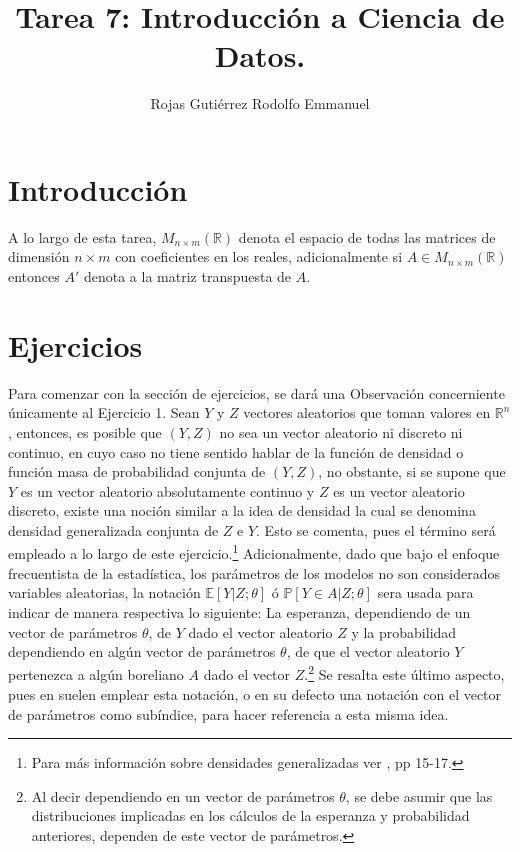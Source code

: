 \documentclass[10.5pt,notitlepage]{article}
\title{Tarea 7: Introducción a Ciencia de Datos.}
\author{Rojas Gutiérrez Rodolfo Emmanuel}
\renewcommand{\qedsymbol}{$\blacksquare$}
\newcommand{\PP}{\mathbb{P}}
\newcommand{\RR}{\mathbb{R}}
\newcommand{\EE}{\mathbb{E}}
\theoremstyle{plain}
\newenvironment{rem}
  {\pushQED{\qed}\renewcommand{\qedsymbol}{$\triangle$}\remarkex}
  {\popQED\endremarkex}
\begin{document}
\maketitle
\section{Introducción}
A lo largo de esta tarea, \(M_{n\times m}(\RR)\) denota el espacio de todas las matrices de dimensión \(n\times m\) con coeficientes en los reales, adicionalmente si \(A \in M_{n\times m}(\RR)\) entonces \(A'\) denota a la matriz transpuesta de \(A\).

\section{Ejercicios}
Para comenzar con la sección de ejercicios, se dará una Observación concerniente únicamente al Ejercicio 1.
\begin{rem}
Sean \(Y\) y \(Z\) vectores aleatorios que toman valores en \(\RR^n\), entonces, es posible que \((Y,Z)\) no sea un vector aleatorio ni discreto ni continuo, en cuyo caso no tiene sentido hablar de la función de densidad o función masa de probabilidad conjunta de \((Y,Z)\), no obstante, si se supone que \(Y\) es un vector aleatorio absolutamente continuo y \(Z\) es un vector aleatorio discreto, existe una noción similar a la idea de densidad la cual se denomina densidad generalizada conjunta de \(Z\) e \(Y\). Esto se comenta, pues el término será empleado a lo largo de este ejercicio.\footnote{Para más información sobre densidades generalizadas ver \textcite{martingonzalezProbabilidadAvanzada2021}, pp 15-17.} Adicionalmente, dado que bajo el enfoque frecuentista de la estadística, los parámetros de los modelos no son considerados variables aleatorias, la notación \(\EE[Y| Z ; \theta ]\) ó \(\PP[Y \in A| Z ; \theta ]\) sera usada para indicar de manera respectiva lo siguiente: La esperanza, dependiendo de un vector de parámetros \(\theta\), de \(Y\) dado el vector aleatorio \(Z\) y la probabilidad dependiendo en algún vector de parámetros \(\theta\), de que el vector aleatorio \(Y\) pertenezca a algún boreliano \(A\) dado el vector \(Z\).\footnote{Al decir dependiendo en un vector de parámetros \(\theta\), se debe asumir que las distribuciones implicadas en los cálculos de la esperanza y probabilidad anteriores, dependen de este vector de parámetros.} Se resalta este último aspecto, pues en \textcite{mclachlan_em_2008} suelen emplear esta notación, o en su defecto una notación con el vector de parámetros como subíndice, para hacer referencia a esta misma idea.
\end{rem}
\end{document}
